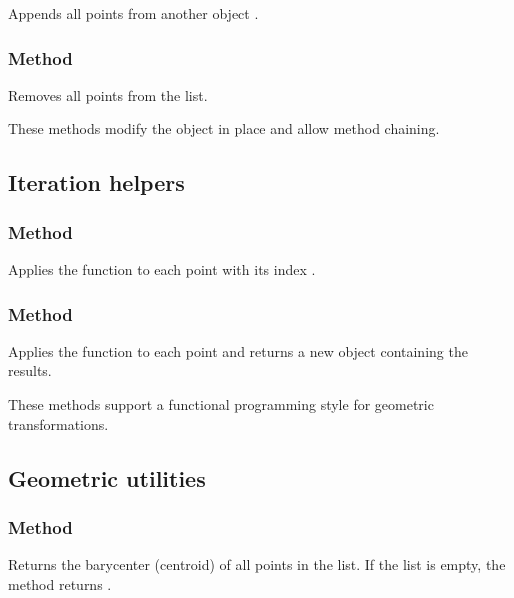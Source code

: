 Appends all points from another  object .

\subsubsection{Method }
\label{ssub:meth_list_point_clear}

Removes all points from the list.


These methods modify the object in place and allow method chaining.

\subsection{Iteration helpers}
\label{subsec:list_point_iteration}

\subsubsection{Method }
\label{ssub:meth_list_point_foreach}

Applies the function  to each point  with its index .

\subsubsection{Method }
\label{ssub:meth_list_point_map}

Applies the function  to each point and returns a new  object
containing the results.


These methods support a functional programming style for geometric transformations.

\subsection{Geometric utilities}
\label{subsec:list_point_geometry}

\subsubsection{Method }
\label{ssub:meth_list_point_barycenter}

Returns the barycenter (centroid) of all points in the list.
If the list is empty, the method returns .


